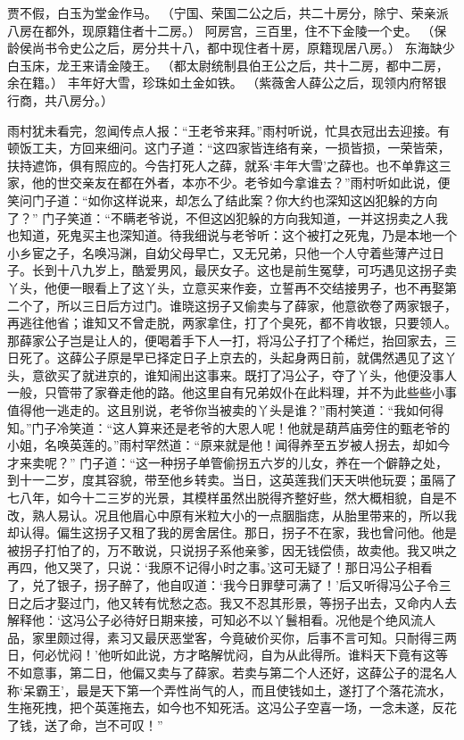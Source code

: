 \documentclass[12pt,oneside]{book}
\begin{document}
贾不假，白玉为堂金作马。
（宁国、荣国二公之后，共二十房分，除宁、荣亲派八房在都外，现原籍住者十二房。）
阿房宫，三百里，住不下金陵一个史。
（保龄侯尚书令史公之后，房分共十八，都中现住者十房，原籍现居八房。）
东海缺少白玉床，龙王来请金陵王。
（都太尉统制县伯王公之后，共十二房，都中二房，余在籍。）
丰年好大雪，珍珠如土金如铁。
（紫薇舍人薛公之后，现领内府帑银行商，共八房分。）

雨村犹未看完，忽闻传点人报：“王老爷来拜。”雨村听说，忙具衣冠出去迎接。有顿饭工夫，方回来细问。这门子道：“这四家皆连络有亲，一损皆损，一荣皆荣，扶持遮饰，俱有照应的。今告打死人之薛，就系‘丰年大雪’之薛也。也不单靠这三家，他的世交亲友在都在外者，本亦不少。老爷如今拿谁去？”雨村听如此说，便笑问门子道：“如你这样说来，却怎么了结此案？你大约也深知这凶犯躲的方向了？”
门子笑道：“不瞒老爷说，不但这凶犯躲的方向我知道，一并这拐卖之人我也知道，死鬼买主也深知道。待我细说与老爷听：这个被打之死鬼，乃是本地一个小乡宦之子，名唤冯渊，自幼父母早亡，又无兄弟，只他一个人守着些薄产过日子。长到十八九岁上，酷爱男风，最厌女子。这也是前生冤孽，可巧遇见这拐子卖丫头，他便一眼看上了这丫头，立意买来作妾，立誓再不交结接男子，也不再娶第二个了，所以三日后方过门。谁晓这拐子又偷卖与了薛家，他意欲卷了两家银子，再逃往他省；谁知又不曾走脱，两家拿住，打了个臭死，都不肯收银，只要领人。那薛家公子岂是让人的，便喝着手下人一打，将冯公子打了个稀烂，抬回家去，三日死了。这薛公子原是早已择定日子上京去的，头起身两日前，就偶然遇见了这丫头，意欲买了就进京的，谁知闹出这事来。既打了冯公子，夺了丫头，他便没事人一般，只管带了家眷走他的路。他这里自有兄弟奴仆在此料理，并不为此些些小事值得他一逃走的。这且别说，老爷你当被卖的丫头是谁？”雨村笑道：“我如何得知。”门子冷笑道：“这人算来还是老爷的大恩人呢！他就是葫芦庙旁住的甄老爷的小姐，名唤英莲的。”雨村罕然道：“原来就是他！闻得养至五岁被人拐去，却如今才来卖呢？”
门子道：“这一种拐子单管偷拐五六岁的儿女，养在一个僻静之处，到十一二岁，度其容貌，带至他乡转卖。当日，这英莲我们天天哄他玩耍；虽隔了七八年，如今十二三岁的光景，其模样虽然出脱得齐整好些，然大概相貌，自是不改，熟人易认。况且他眉心中原有米粒大小的一点胭脂痣，从胎里带来的，所以我却认得。偏生这拐子又租了我的房舍居住。那日，拐子不在家，我也曾问他。他是被拐子打怕了的，万不敢说，只说拐子系他亲爹，因无钱偿债，故卖他。我又哄之再四，他又哭了，只说：‘我原不记得小时之事。’这可无疑了！那日冯公子相看了，兑了银子，拐子醉了，他自叹道：‘我今日罪孽可满了！’后又听得冯公子令三日之后才娶过门，他又转有忧愁之态。我又不忍其形景，等拐子出去，又命内人去解释他：‘这冯公子必待好日期来接，可知必不以丫鬟相看。况他是个绝风流人品，家里颇过得，素习又最厌恶堂客，今竟破价买你，后事不言可知。只耐得三两日，何必忧闷！’他听如此说，方才略解忧闷，自为从此得所。谁料天下竟有这等不如意事，第二日，他偏又卖与了薛家。若卖与第二个人还好，这薛公子的混名人称‘呆霸王’，最是天下第一个弄性尚气的人，而且使钱如土，遂打了个落花流水，生拖死拽，把个英莲拖去，如今也不知死活。这冯公子空喜一场，一念未遂，反花了钱，送了命，岂不可叹！”
\end{document}
